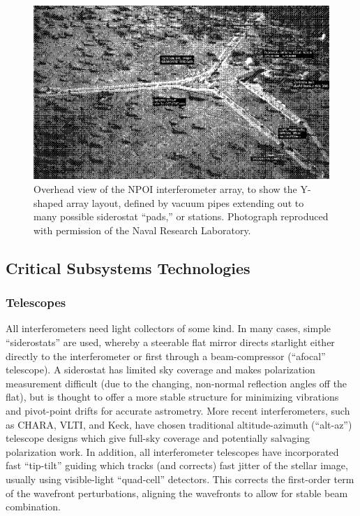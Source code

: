 \documentclass[12pt]{article}
\begin{document}
\begin{figure}
\begin{center}
\includegraphics[clip,width=7in]{Figures/JDM_NPOIaerialArrow.eps}
\caption
{Overhead view of the NPOI interferometer array, to show the
Y-shaped array layout, defined by vacuum pipes extending out to many
possible siderostat ``pads,'' or stations. Photograph reproduced with
permission of the Naval Research Laboratory.
\label{npoi}}
\end{center}
\end{figure}

\subsection{Critical Subsystems Technologies}

\subsubsection{Telescopes}
All interferometers need light collectors of some kind.  In many
cases, simple ``siderostats'' are used, whereby a steerable flat
mirror directs starlight either directly to the interferometer or
first through a beam-compressor (``afocal'' telescope).  A siderostat
has limited sky coverage and makes polarization measurement difficult
(due to the changing, non-normal reflection angles off the flat), but
is thought to offer a more stable structure for minimizing vibrations
and pivot-point drifts for accurate astrometry.  More recent
interferometers, such as CHARA, VLTI, and Keck, have chosen
traditional altitude-azimuth (``alt-az'') telescope designs which give
full-sky coverage and potentially salvaging polarization work.  In
addition, all interferometer telescopes have incorporated fast
``tip-tilt'' guiding which tracks (and corrects) fast jitter of
the stellar image, usually using visible-light ``quad-cell''
detectors.  This corrects the first-order term of the wavefront
perturbations, aligning the wavefronts to allow for stable beam
combination.
\end{document}
